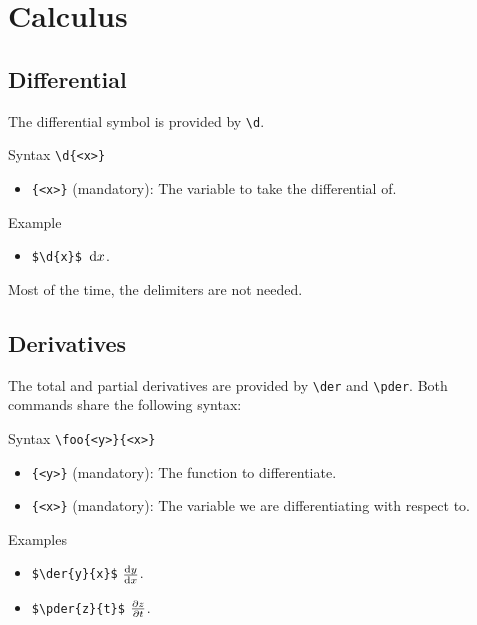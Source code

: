 \section{Calculus}

\subsection{Differential}

The differential symbol is provided by \verb|\d|.

\begin{myframe}{Syntax }
    \verb|\d{<x>}|
    \begin{itemize}
        \item \verb|{<x>}| (mandatory): The variable to take the differential of.
    \end{itemize}
\end{myframe}

\begin{myframe}{Example }
    \begin{itemize}
        \item \verb|$\d{x}$| \produces{} $\,\mathrm{d}x$.
    \end{itemize}
\end{myframe}

Most of the time, the delimiters are not needed.

\subsection{Derivatives}

The total and partial derivatives are provided by \verb|\der| and \verb|\pder|. Both commands share the following syntax:

\begin{myframe}{Syntax}
    \verb|\foo{<y>}{<x>}|
    \begin{itemize}
        \item \verb|{<y>}| (mandatory): The function to differentiate.
        \item \verb|{<x>}| (mandatory): The variable we are differentiating with respect to.
    \end{itemize}
\end{myframe}

\begin{myframe}{Examples}
    \begin{itemize}
        \item \verb|$\der{y}{x}$| \produces{} $\der{y}{x}$.
        \item \verb|$\pder{z}{t}$| \produces{} $\pder{z}{t}$.
    \end{itemize}
\end{myframe}

